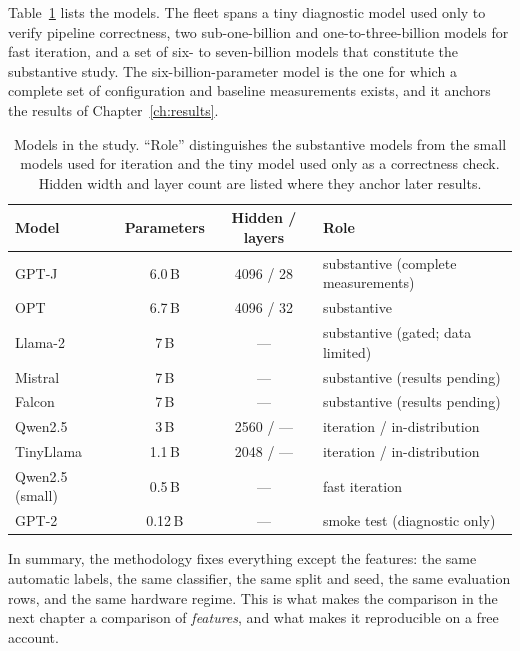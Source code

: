Table~\ref{tab:models} lists the models. The fleet spans a tiny diagnostic model used only
to verify pipeline correctness, two sub-one-billion and one-to-three-billion models for
fast iteration, and a set of six- to seven-billion models that constitute the substantive
study. The six-billion-parameter model is the one for which a complete set of
configuration and baseline measurements exists, and it anchors the results of
Chapter~\ref{ch:results}.

\begin{table}[t]
\centering
\caption{Models in the study. ``Role'' distinguishes the substantive models from the small
models used for iteration and the tiny model used only as a correctness check. Hidden
width and layer count are listed where they anchor later results.}
\label{tab:models}
\small
\renewcommand{\arraystretch}{1.2}
\begin{tabular}{l c c l}
\toprule
\textbf{Model} & \textbf{Parameters} & \textbf{Hidden / layers} & \textbf{Role} \\
\midrule
GPT-J~\cite{wang2021gptj}            & 6.0\,B  & 4096 / 28 & substantive (complete measurements) \\
OPT~\cite{zhang2022opt}              & 6.7\,B  & 4096 / 32 & substantive \\
Llama-2~\cite{touvron2023llama2}     & 7\,B    & ---        & substantive (gated; data limited) \\
Mistral~\cite{jiang2023mistral}      & 7\,B    & ---        & substantive (results pending) \\
Falcon~\cite{almazrouei2023falcon}   & 7\,B    & ---        & substantive (results pending) \\
Qwen2.5~\cite{qwen2024report}        & 3\,B    & 2560 / --- & iteration / in-distribution \\
TinyLlama~\cite{zhang2024tinyllama}  & 1.1\,B  & 2048 / --- & iteration / in-distribution \\
Qwen2.5 (small)~\cite{qwen2024report}& 0.5\,B  & ---        & fast iteration \\
GPT-2~\cite{radford2019gpt2}         & 0.12\,B & ---        & smoke test (diagnostic only) \\
\bottomrule
\end{tabular}
\end{table}

In summary, the methodology fixes everything except the features: the same automatic
labels, the same classifier, the same split and seed, the same evaluation rows, and the
same hardware regime. This is what makes the comparison in the next chapter a comparison
of \emph{features}, and what makes it reproducible on a free account.
